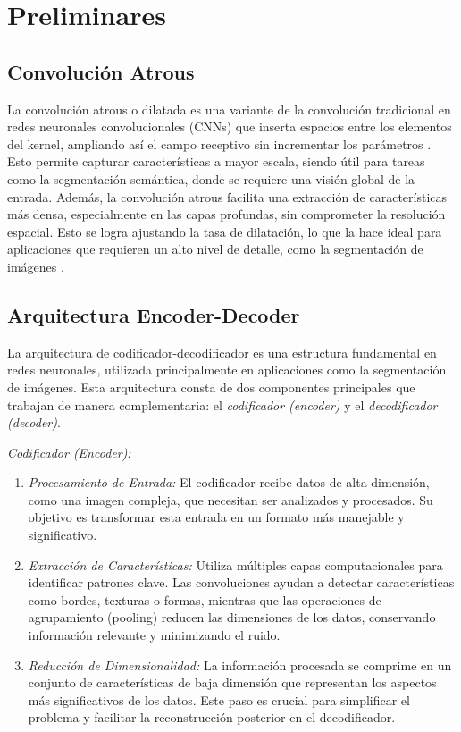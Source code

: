 \section{Preliminares}

\subsection{Convolución Atrous}
La convolución atrous o dilatada es una variante de la convolución tradicional en redes neuronales convolucionales (CNNs) que inserta espacios entre los elementos del kernel, ampliando así el campo receptivo sin incrementar los parámetros \cite{chen2017}. Esto permite capturar características a mayor escala, siendo útil para tareas como la segmentación semántica, donde se requiere una visión global de la entrada. Además, la convolución atrous facilita una extracción de características más densa, especialmente en las capas profundas, sin comprometer la resolución espacial. Esto se logra ajustando la tasa de dilatación, lo que la hace ideal para aplicaciones que requieren un alto nivel de detalle, como la segmentación de imágenes \cite{chollet2016}.

\subsection{Arquitectura Encoder-Decoder}
La arquitectura de codificador-decodificador es una estructura fundamental en redes neuronales, utilizada principalmente en aplicaciones como la segmentación de imágenes. Esta arquitectura consta de dos componentes principales que trabajan de manera complementaria: el \textit{codificador (encoder)} y el \textit{decodificador (decoder)}.

\textit{Codificador (Encoder):}

\begin{enumerate}

    \item \emph{Procesamiento de Entrada:} El codificador recibe datos de alta dimensión, como una imagen compleja, que necesitan ser analizados y procesados. Su objetivo es transformar esta entrada en un formato más manejable y significativo.
    
    \item \emph{Extracción de Características:} Utiliza múltiples capas computacionales para identificar patrones clave. Las convoluciones ayudan a detectar características como bordes, texturas o formas, mientras que las operaciones de agrupamiento (pooling) reducen las dimensiones de los datos, conservando información relevante y minimizando el ruido.
    
    \item \emph{Reducción de Dimensionalidad:} La información procesada se comprime en un conjunto de características de baja dimensión que representan los aspectos más significativos de los datos. Este paso es crucial para simplificar el problema y facilitar la reconstrucción posterior en el decodificador.

\end{enumerate}

